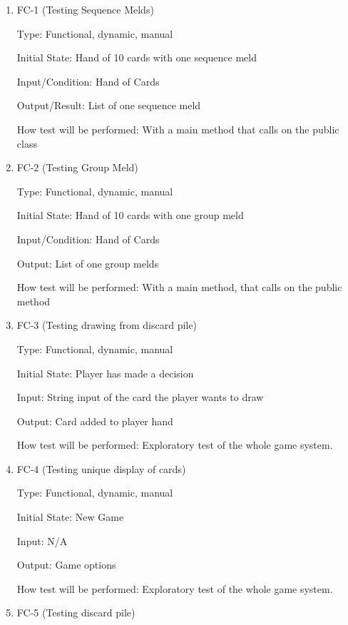 \documentclass[12pt, titlepage]{article}
\begin{document}
\begin{enumerate}

\item{FC-1 (Testing Sequence Melds)\\}

Type: Functional, dynamic, manual
					
Initial State: Hand of 10 cards with one sequence meld
					
Input/Condition: Hand of Cards
					
Output/Result: List of one sequence meld
					
How test will be performed: With a main method that calls on the public class
					
\item{FC-2 (Testing Group Meld)\\}

Type: Functional, dynamic, manual
					
Initial State: Hand of 10 cards with one group meld
					
Input/Condition: Hand of Cards
					
Output: List of one group melds
					
How test will be performed: With a main method, that calls on the public method

\item{FC-3 (Testing drawing from discard pile)\\}

Type: Functional, dynamic, manual
					
Initial State: Player has made a decision
					
Input: String input of the card the player wants to draw
					
Output: Card added to player hand
					
How test will be performed: Exploratory test of the whole game system.

\item{FC-4 (Testing unique display of cards)\\}

Type: Functional, dynamic, manual
					
Initial State: New Game
					
Input: N/A
					
Output: Game options
					
How test will be performed: Exploratory test of the whole game system.

\item{FC-5 (Testing discard pile)\\}


\end{enumerate}
\end{document}
